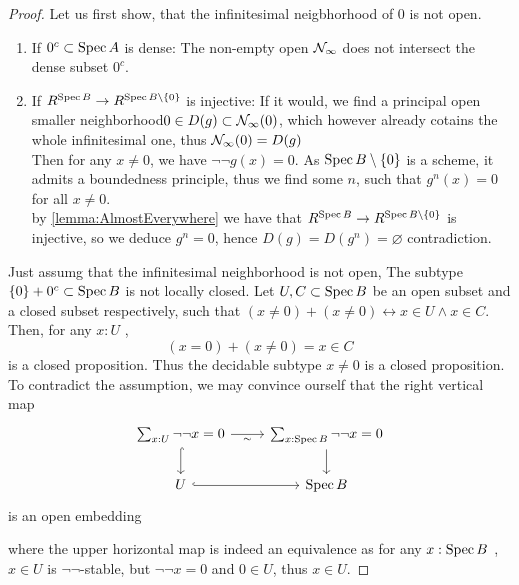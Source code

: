 \documentclass{article}
\begin{document}
\begin{proof}
	Let us first show, that the infinitesimal neigbhorhood of $0$ is not open. 
	\begin{enumerate}
		\item If $0^c \subset \operatorname{Spec} A$ is dense:
		The non-empty open $\mathcal{N}_\infty$  does not intersect the dense subset $0^c$.
		
		\item If $R^{\operatorname{Spec} B} \to R^{\operatorname{Spec} B \setminus \{0\}}$ is injective:
		If it would, we find a principal open smaller neighborhood$0 \in D(g) \subset \mathcal{N}_\infty(0)$, which however already cotains the whole infinitesimal one, thus $\mathcal{N}_\infty(0) = D(g)$ \\
		Then for any $x \neq 0$, we have $\lnot \lnot g(x) = 0$. As $\operatorname{Spec} B \setminus \{0\}$ is a scheme, it admits a boundedness principle, thus we find some $n$, such that $g^n (x) = 0$ for all $x \neq 0$. \\ %
		by \ref{lemma:AlmostEverywhere} we have that $R^{\operatorname{Spec} B} \to R^{\operatorname{Spec} B \setminus \{0\}}$ is injective, so we deduce $g^n =0$, hence $D(g) = D(g^n) = \varnothing$ contradiction.
	\end{enumerate}
	Just assumg that the infinitesimal neighborhood is not open,	The subtype $\{0\} + 0^c \subset \operatorname{Spec} B$ is not locally closed.	Let $U , C \subset \operatorname{Spec} B$ be an open subset and a closed subset respectively, such that $(x \neq 0) + (x \neq 0) \leftrightarrow x \in U \land x \in C$. Then, for any $x : U$ , 
	\[
	(x = 0) + (x \neq 0) = x \in C
	\]
	is a closed proposition. Thus the decidable subtype $x \neq 0$ is a closed proposition. To contradict the assumption, we may convince ourself that the right vertical map
	\[\begin{tikzcd}
		{\sum_{x: U} \lnot \lnot x = 0} & {	\sum_{x : \Spec B} \lnot \lnot x = 0} \\
		U & {\Spec B}
		\arrow["\sim"', from=1-1, to=1-2]
		\arrow[hook, from=1-1, to=2-1]
		\arrow[from=1-2, to=2-2]
		\arrow[hook, from=2-1, to=2-2]
	\end{tikzcd}\]
	is an open embedding
	
	where the upper horizontal map is indeed an equivalence as for any $x : \operatorname{Spec} B$ , $x \in U$ is $\lnot \lnot$-stable, but $\lnot \lnot x = 0$ and $0 \in U$, thus $x \in U$.
	
\end{proof}
\end{document}
